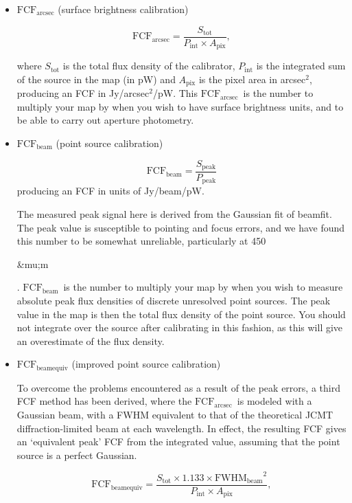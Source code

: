 \documentclass[twoside,11pt]{article}
\newcommand{\micron}{\mbox{\,${\umu}$m}}            %
\newcommand{\xref}[3]{#1}
\renewcommand{\_}{\texttt{\symbol{95}}}
\newcommand{\fcfbe}{$\mathrm{FCF_{beamequiv}}$}
\newcommand{\fcfb}{$\mathrm{FCF_{beam}}$}
\newcommand{\fcfa}{$\mathrm{FCF_{arcsec}}$}
\newcommand{\task}[1]{\textsf{#1}}
\newcommand{\beamfit}{\xref{\task{beamfit}}{sun95}{BEAMFIT}}
\renewcommand{\micron}{\begin{rawhtml}&mu;m\end{rawhtml}}
\begin{document}
\begin{itemize}

\item{\textbf{\fcfa} (surface brightness calibration)}

\begin{equation}
\label{eq:fcf_arcsec}
\mathrm{FCF_{arcsec}} = \frac{S_\mathrm{tot}}{P_\mathrm{int} \times
  A_\mathrm{pix}},
\end{equation}

where $S_\mathrm{tot}$ is the total flux density of the calibrator,
$P_\mathrm{int}$ is the integrated sum of the source in the map (in
pW) and $A_\mathrm{pix}$ is the pixel area in arcsec$^2$, producing an
FCF in Jy/arcsec$^2$/pW. This \fcfa\ is the number to
multiply your map by when you wish to have surface brightness units,
and to be able to carry out aperture photometry.

\item{\textbf{\fcfb} (point source calibration)}

\begin{equation}
\label{eq:fcf_beam}
\mathrm{FCF_{beam}} = \frac{S_\mathrm{{peak}}}{P_\mathrm{peak}}
\end{equation}
producing an FCF in units of Jy/beam/pW.

The measured peak signal here is derived from the Gaussian fit of
\beamfit. The peak value is susceptible to pointing and focus errors,
and we have found this number to be somewhat unreliable, particularly
at 450\micron. \fcfb\ is the number to multiply your
map by when you wish to measure absolute peak flux densities of
discrete unresolved point sources. The peak value in the map is then
the total flux density of the point source. You should not integrate
over the source after calibrating in this fashion, as this will give
an overestimate of the flux density.

\item{\textbf{\fcfbe} (improved point source calibration)}

To overcome the problems encountered as a result of the peak errors, a
third FCF method has been derived, where the \fcfa\
is modeled with a Gaussian beam, with a FWHM equivalent to that of the
theoretical JCMT diffraction-limited beam at each wavelength. In
effect, the resulting FCF gives an `equivalent peak' FCF from the
integrated value, assuming that the point source is a perfect
Gaussian.

\begin{equation}
\label{eq:fcf_beamequiv}
\mathrm{FCF_{beamequiv}} = \frac{S_\mathrm{tot} \times 1.133 \times
  {\mathrm{FWHM_{beam}}}^2}{P_\mathrm{int} \times A_\mathrm{pix}},
\end{equation}


\end{itemize}
\end{document}

